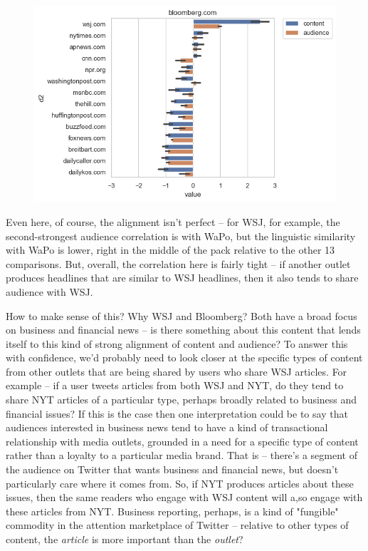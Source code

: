 \documentclass{scrartcl}
\begin{document}
\begin{figure}[H]
  \centering
  \includegraphics[width=\textwidth]{figures/ca-bloomberg-composite.png}
\end{figure}

Even here, of course, the alignment isn't perfect -- for WSJ, for example, the second-strongest audience correlation is with WaPo, but the linguistic similarity with WaPo is lower, right in the middle of the pack relative to the other 13 comparisons. But, overall, the correlation here is fairly tight -- if another outlet produces headlines that are similar to WSJ headlines, then it also tends to share audience with WSJ.

How to make sense of this? Why WSJ and Bloomberg? Both have a broad focus on business and financial news -- is there something about this content that lends itself to this kind of strong alignment of content and audience? To answer this with confidence, we'd probably need to look closer at the specific types of content from other outlets that are being shared by users who share WSJ articles. For example -- if a user tweets articles from both WSJ and NYT, do they tend to share NYT articles of a particular type, perhaps broadly related to business and financial issues? If this is the case then one interpretation could be to say that audiences interested in business news tend to have a kind of transactional relationship with media outlets, grounded in a need for a specific type of content rather than a loyalty to a particular media brand. That is -- there's a segment of the audience on Twitter that wants business and financial news, but doesn't particularly care where it comes from. So, if NYT produces articles about these issues, then the same readers who engage with WSJ content will a,so engage with these articles from NYT. Business reporting, perhaps, is a kind of "fungible" commodity in the attention marketplace of Twitter -- relative to other types of content, the \textit{article} is more important than the \textit{outlet}?
\end{document}
